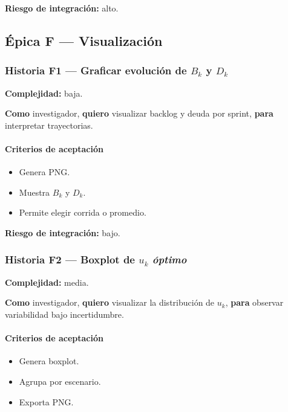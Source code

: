 \documentclass[11pt,a4paper]{article}
\begin{document}
\textbf{Riesgo de integraci\'on:} alto.

\subsection{\'Epica F --- Visualizaci\'on}

\subsubsection{Historia F1 --- Graficar evoluci\'on de $B_k$ y $D_k$}

\textbf{Complejidad:} baja.

\textbf{Como} investigador, \textbf{quiero} visualizar backlog y deuda por sprint, \textbf{para} interpretar trayectorias.

\paragraph{Criterios de aceptaci\'on}

\begin{itemize}[leftmargin=*]
    \item Genera PNG.
    \item Muestra $B_k$ y $D_k$.
    \item Permite elegir corrida o promedio.
\end{itemize}

\textbf{Riesgo de integraci\'on:} bajo.

\subsubsection{Historia F2 --- Boxplot de $u_k$ \textit{\'optimo}}

\textbf{Complejidad:} media.

\textbf{Como} investigador, \textbf{quiero} visualizar la distribuci\'on de $u_k$, \textbf{para} observar variabilidad bajo incertidumbre.

\paragraph{Criterios de aceptaci\'on}

\begin{itemize}[leftmargin=*]
    \item Genera boxplot.
    \item Agrupa por escenario.
    \item Exporta PNG.
\end{itemize}
\end{document}

